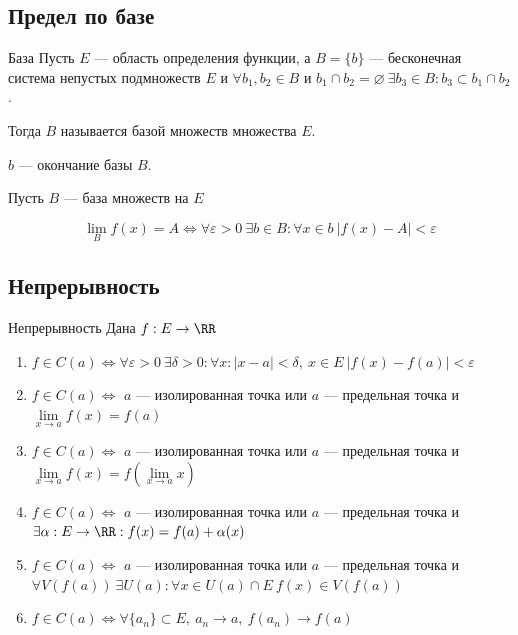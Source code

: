\subsection{Предел по базе}

\begin{defn}{База}{}
    Пусть \( E \) --- область определения функции, а \( B = \{ b \} \) 
    --- бесконечная система непустых подмножеств \( E \)
    и \( \forall b_1, b_2 \in B \) и \( b_1 \cap b_2 = \varnothing \ \exists b_3 \in B : b_3 \subset b_1 \cap b_2 \).

    Тогда \( B \) называется базой множеств множества \( E \).

    \( b \) --- окончание базы \( B \).
\end{defn}

\begin{defn}{}{}
    Пусть \( B \) --- база множеств на \( E \)

    \[
        \lim\limits_B f(x) = A 
        \Leftrightarrow 
        \forall \varepsilon > 0 \ \exists b \in B : \forall x \in b \ |f(x) - A| < \varepsilon
    \]
\end{defn}

\subsection{Непрерывность}

\begin{defn}{Непрерывность}{}
    Дана \( f : E \to \RR \)

    \begin{enumerate}
        \item
            \( 
                f \in C(a) \Leftrightarrow \forall \varepsilon > 0 \ \exists \delta > 0 : 
                \forall x : | x - a | < \delta, \ x \in E \ | f(x) - f(a) | < \varepsilon
            \)
        \item
            \( f \in C(a) \Leftrightarrow \) \( a \) --- изолированная точка
            или \( a \) --- предельная точка и \( \lim\limits_{x \to a} f(x) = f(a) \)
        \item
            \( f \in C(a) \Leftrightarrow \) \( a \) --- изолированная точка
            или \( a \) --- предельная точка и \( \lim\limits_{x \to a} f(x) = f( \lim\limits_{x \to a} x) \)
        \item
            \( f \in C(a) \Leftrightarrow \) \( a \) --- изолированная точка
            или \( a \) --- предельная точка и 
            \( \exists \alpha : E \to \RR :  f(x) = f(a) + \alpha(x) \)
        \item
            \( f \in C(a) \Leftrightarrow \) \( a \) --- изолированная точка
            или \( a \) --- предельная точка и 
            \( \forall V(f(a)) \ \exists U(a) : \forall x \in U(a) \cap E \ f(x) \in V(f(a)) \)
        \item
            \( f \in C(a) \Leftrightarrow \forall \{ a_n \} \subset E, \ a_n \to a, \ f(a_n) \to f(a) \)
    \end{enumerate}
\end{defn}

